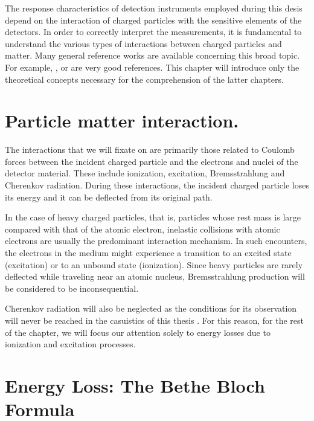\pagestyle{fancy}

\graphicspath{ {Figures/Chapter3_BeamMatterInteraction/} }

The response characteristics of detection instruments employed during this desis depend on the interaction of charged particles with the sensitive elements of the detectors. In order to correctly interpret the measurements, it is fundamental to understand the various types of interactions between charged particles and matter. Many general reference works are available concerning this broad topic. For example, \parencite*[]{ref:Knoll}, \parencite*[]{ref:Evans} or \parencite*[]{ref:avernier} are very good references. This chapter will introduce only the theoretical concepts necessary for the comprehension of the latter chapters. 

\section{Particle matter interaction.}

The interactions that we will fixate on are primarily those related to Coulomb forces between the incident charged particle and the electrons and nuclei of the detector material. These include ionization, excitation, Bremsstrahlung and Cherenkov radiation. During these interactions, the incident charged particle loses its energy and it can be deflected from its original path. 

In the case of heavy charged particles, that is, particles whose rest mass is large compared with that of the atomic electron, inelastic collisions with atomic electrons are usually the predominant interaction mechanism. In such encounters, the electrons in the medium might experience a transition to an excited state (excitation) or to an unbound state (ionization). Since heavy particles are rarely deflected while traveling near an atomic nucleus, Bremsstrahlung production will be considered to be inconsequential. 

Cherenkov radiation will also be neglected as the conditions for its observation will never be reached in the casuistics of this thesis \parencite*[]{ref:Cherenkov}. For this reason, for the rest of the chapter, we will focus our attention solely to energy losses due to ionization and excitation processes. 

\section{Energy Loss: The Bethe Bloch Formula}
\label{sec:Bethe}

